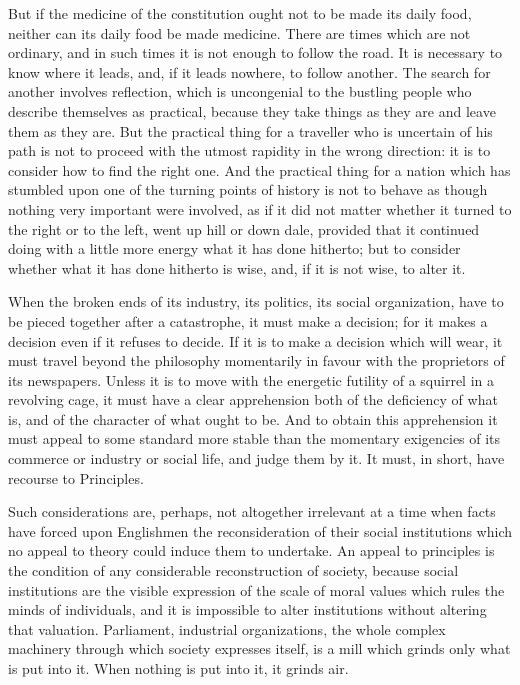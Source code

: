 \documentclass{book}
\begin{document}
But if the medicine of the constitution ought not to be made its daily food, neither can its daily food be made medicine. There are times which are not ordinary, and in such times it is not enough to follow the road. It is necessary to know where it leads, and, if it leads nowhere, to follow another. The search for another involves reflection, which is uncongenial to the bustling people who describe themselves as practical, because they take things as they are and leave them as they are. But the practical thing for a traveller who is uncertain of his path is not to proceed with the utmost rapidity in the wrong direction: it is to consider how to find the right one. And the practical thing for a nation which has stumbled upon one of the turning points of history is not to behave as though nothing very important were involved, as if it did not matter whether it turned to the right or to the left, went up hill or down dale, provided that it continued doing with a little more energy what it has done hitherto; but to consider whether what it has done hitherto is wise, and, if it is not wise, to alter it.

When the broken ends of its industry, its politics, its social organization, have to be pieced together after a catastrophe, it must make a decision; for it makes a decision even if it refuses to decide. If it is to make a decision which will wear, it must travel beyond the philosophy momentarily in favour with the proprietors of its newspapers. Unless it is to move with the energetic futility of a squirrel in a revolving cage, it must have a clear apprehension both of the deficiency of what is, and of the character of what ought to be. And to obtain this apprehension it must appeal to some standard more stable than the momentary exigencies of its commerce or industry or social life, and judge them by it. It must, in short, have recourse to Principles.

Such considerations are, perhaps, not altogether irrelevant at a time when facts have forced upon Englishmen the reconsideration of their social institutions which no appeal to theory could induce them to undertake. An appeal to principles is the condition of any considerable reconstruction of society, because social institutions are the visible expression of the scale of moral values which rules the minds of individuals, and it is impossible to alter institutions without altering that valuation. Parliament, industrial organizations, the whole complex machinery through which society expresses itself, is a mill which grinds only what is put into it. When nothing is put into it, it grinds air.
\end{document}
